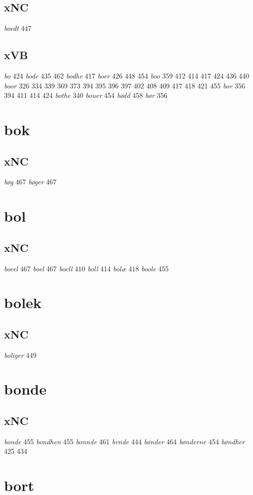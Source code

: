 \documentclass[a4paper,twocolumn]{article}
\begin{document}
\subsection{xNC}
\label{sec:orge175048}
\emph{boedt} 447 
\subsection{xVB}
\label{sec:orgcfb515a}
\emph{bo} 424 \emph{bode} 435 462 \emph{bodhe} 417 \emph{boer} 426 448 454 \emph{boo} 359 412 414 417 424 436 440 \emph{boor} 326 334 339 369 373 394 395 396 397 402 408 409 417 418 421 455 \emph{bor} 356 394 411 414 424 \emph{bothe} 340 \emph{bouer} 454 \emph{bødd} 458 \emph{bør} 356 
\section{bok}
\label{sec:org13b8f3a}
\subsection{xNC}
\label{sec:orgdc20ac7}
\emph{bøg} 467 \emph{bøger} 467 
\section{bol}
\label{sec:org0311354}
\subsection{xNC}
\label{sec:org200f504}
\emph{boeel} 467 \emph{boel} 467 \emph{boell} 410 \emph{boll} 414 \emph{bolæ} 418 \emph{boole} 455 
\section{bolek}
\label{sec:org3a0d50c}
\subsection{xNC}
\label{sec:org02a4fa7}
\emph{boliger} 449 
\section{bonde}
\label{sec:orge28a492}
\subsection{xNC}
\label{sec:org48e92e9}
\emph{bonde} 455 \emph{bondhen} 455 \emph{bonnde} 461 \emph{bvnde} 444 \emph{bønder} 464 \emph{bønderne} 454 \emph{bøndher} 425 434 
\section{bort}
\label{sec:org0f435f7}
\end{document}
